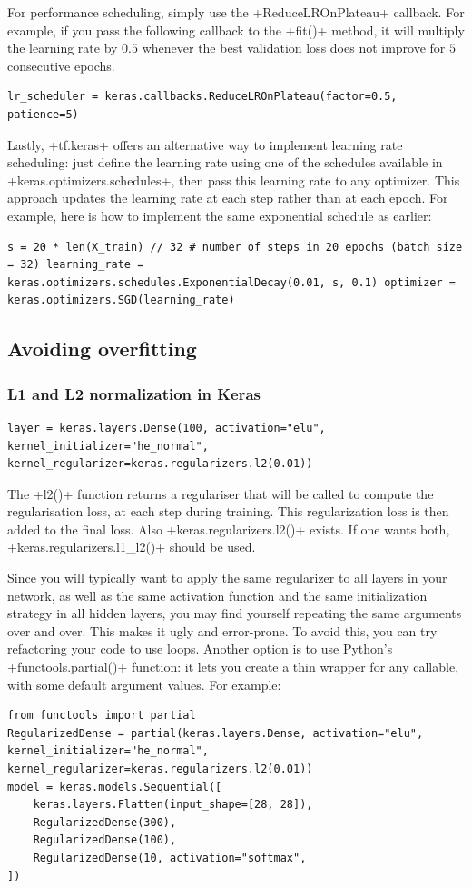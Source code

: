 For performance scheduling, simply use the \cd+ReduceLROnPlateau+ callback. For example, if you pass the following callback to the \cd+fit()+ method, it will multiply the learning rate by $0.5$ whenever the best validation loss does not improve for $5$ consecutive epochs.
\begin{lstlisting}
lr_scheduler = keras.callbacks.ReduceLROnPlateau(factor=0.5, patience=5)
\end{lstlisting}
Lastly, \cd+tf.keras+ offers an alternative way to implement learning rate scheduling: just define the learning rate using one of the schedules available in \cd+keras.optimizers.schedules+, then pass this learning rate to any optimizer. This approach updates the learning rate at each step rather than at each epoch. For example, here is how to implement the same exponential schedule as earlier:
\begin{lstlisting}
s = 20 * len(X_train) // 32 # number of steps in 20 epochs (batch size = 32) learning_rate = keras.optimizers.schedules.ExponentialDecay(0.01, s, 0.1) optimizer = keras.optimizers.SGD(learning_rate)
\end{lstlisting}
\subsection{Avoiding overfitting}
\subsubsection{L1 and L2 normalization in Keras}
\begin{lstlisting}
layer = keras.layers.Dense(100, activation="elu", kernel_initializer="he_normal", kernel_regularizer=keras.regularizers.l2(0.01))
\end{lstlisting}
The \cd+l2()+ function returns a regulariser that will be called to compute the regularisation loss, at each step during training. This regularization loss is then added to the final loss. Also \cd+keras.regularizers.l2()+ exists. If one wants both, \cd+keras.regularizers.l1_l2()+ should be used.

Since you will typically want to apply the same regularizer to all layers in your network, as well as the same activation function and the same initialization strategy in all hidden layers, you may find yourself repeating the same arguments over and over. This makes it ugly and error-prone. To avoid this, you can try refactoring your code to use loops. Another option is to use Python's \cd+functools.partial()+ function: it lets you create a thin wrapper for any callable, with some default argument values. For example:
\begin{lstlisting}
from functools import partial
RegularizedDense = partial(keras.layers.Dense, activation="elu", kernel_initializer="he_normal", kernel_regularizer=keras.regularizers.l2(0.01))
model = keras.models.Sequential([
	keras.layers.Flatten(input_shape=[28, 28]),
    RegularizedDense(300),
    RegularizedDense(100),
    RegularizedDense(10, activation="softmax",
])
\end{lstlisting}
